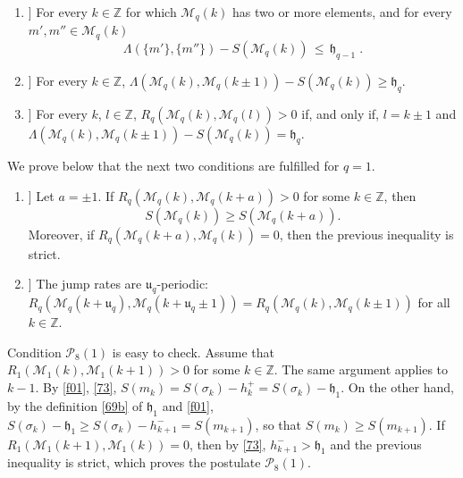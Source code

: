 \documentclass[reqno]{amsart}
\theoremstyle{plain}
\theoremstyle{definition}
\newcommand{\mc}[1]{{\mathcal #1}}
\newcommand{\mf}[1]{{\mathfrak #1}}
\newcommand{\bb}[1]{{\mathbb #1}}
\newcommand{\ms}[1]{{\mathscr #1}}
\newcounter{as}[section]
\newcommand{\<}{\langle}
\renewcommand{\>}{\rangle}
\begin{document}
\begin{enumerate}

\item[[$\mc P_5(q)$\!\!\!]]  For every $k\in \bb Z$ for which
$\ms M_{q}(k)$ has two or more elements, and for every
$m',m''\in \ms M_{q}(k)$
\begin{equation}
\label{48}
\Lambda (\{m'\},\{m''\}) - S(\ms M_{q}(k))\, \le\, \mf h_{q-1} \;.
\end{equation}

\item[[$\mc P_6(q)$\!\!\!]] For every $k\in \bb Z$,
$\displaystyle \Lambda (\ms M_{q}(k),\ms M_{q}(k\pm
1))-S(\ms M_{q}(k)) \ge \mf h_{q}.$

\item[[$\mc P_7(q)$\!\!\!]] For every $k$, $l \in \bb Z$,
$R_q(\ms M_{q}(k),\ms M_{q}(l))>0$ if, and only if, $l = k \pm 1$
and
$\displaystyle \Lambda (\ms M_{q}(k), \ms M_{q}(k\pm 1))-S(\ms
M_{q}(k)) = \mf h_{q}$.

\end{enumerate}

 
We prove below that the next two conditions are fulfilled for $q=1$.

\begin{enumerate}

\item[[$\mc P_8(q)$\!\!\!]] Let $a=\pm 1$. If
$R_q(\ms M_{q}(k),\ms M_{q}(k+a))>0$ for some $k\in \bb Z$, then
\begin{equation*}
S(\ms M_{q}(k))\geq S(\ms M_{q}(k+a)).
\end{equation*}
Moreover, if $R_q(\ms M_{q}(k+a),\ms M_{q}(k)) = 0$, then the
previous inequality is strict.

\item[[$\mc P_9(q)$\!\!\!]]
The jump rates are $\mf u_q$-periodic:
$R_q(\ms M_{q}(k+ \mf u_q),\ms M_{q}(k+ \mf u_q \pm 1)) = R_q(\ms
M_{q}(k),\ms M_{q}(k\pm 1))$ for all $k\in \bb Z$.

\end{enumerate}

Condition $\mc P_8(1)$ is easy to check. Assume that
$R_{1}(\ms M_{1}(k),\ms M_{1}(k + 1))>0$ for some $k\in \bb Z$. The
same argument applies to $k-1$. By \eqref{f01}, \eqref{73},
$S(m_k) = S(\sigma_{k}) - h^+_k = S(\sigma_{k}) - \mf h_1$.  On the
other hand, by the definition \eqref{69b} of $\mf h_1$ and \eqref{f01},
$S(\sigma_{k}) - \mf h_1 \ge S(\sigma_{k}) - h^-_{k+1} = S(m_{k+1})$,
so that $S(m_k) \ge S(m_{k+1})$. If
$R_{1}(\ms M_{1}(k + 1),\ms M_{1}(k)) = 0$, then by \eqref{73},
$h^-_{k+1} > \mf h_1$ and the previous inequality is strict, which
proves the postulate $\mc P_8(1)$.
\end{document}
